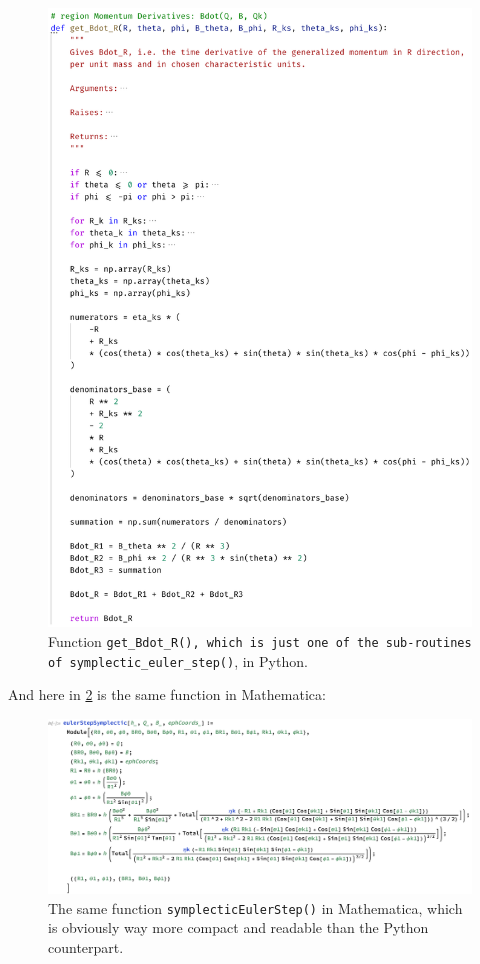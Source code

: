 \begin{figure}[H]
    \centering
    \includegraphics[width=0.90\linewidth]{fig/unit-testing-sympletic-euler-step-python-2.png}
    \caption{Function \texttt{get\_Bdot\_R(), which is just one of the sub-routines of \texttt{symplectic\_euler\_step()}}, in Python.}
    \label{fig:unit-testing-sympletic-euler-step-python-2}
\end{figure}

And here in \cref{fig:unit-testing-sympletic-euler-step-mathematica} is the same function in Mathematica:

\begin{figure}[H]
    \centering
    \includegraphics[width=1.0\linewidth]{fig/unit-testing-sympletic-euler-step-mathematica.pdf}
    \caption{The same function \texttt{symplecticEulerStep()} in Mathematica, which is obviously way more compact and readable than the Python counterpart.}
    \label{fig:unit-testing-sympletic-euler-step-mathematica}
\end{figure}


